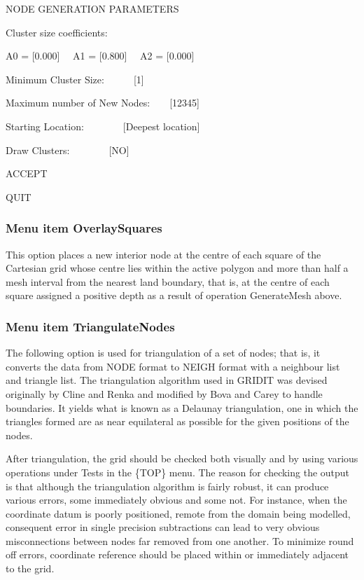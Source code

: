\documentclass{article}
\begin{document}
\begin{center}

NODE GENERATION PARAMETERS

Cluster size coefficients:

A0 = [0.000]\newline
\ \ A1 = [0.800]\newline
\ \ A2 = [0.000]

Minimum Cluster Size:\ \ \ \ \ \ [1]

Maximum number of New Nodes:\ \ \ \ [12345]

Starting Location:\ \ \ \ \ \ \ \ [Deepest location]

Draw Clusters:\ \ \ \ \ \ \ \ [NO]

ACCEPT

QUIT

\end{center}
\subsubsection[Menu item OverlaySquares]{Menu item OverlaySquares}
This option places a new interior node at the centre of each square of the Cartesian grid whose centre lies within the active polygon and more than half a mesh interval from the nearest land boundary, that is, at the centre of each square assigned a positive depth as a result of operation GenerateMesh above.

\subsubsection[Menu item TriangulateNodes]{Menu item TriangulateNodes}
The following option is used for triangulation of a set of nodes; that is, it converts the data from NODE format to NEIGH format with a neighbour list and triangle list. The triangulation algorithm used in GRIDIT was devised originally by Cline and Renka and modified by Bova and Carey to handle boundaries. It yields what is known as a Delaunay triangulation, one in which the triangles formed are as near equilateral as possible for the given positions of the nodes.

After triangulation, the grid should be checked both visually and by using various operations under Tests in the \{TOP\} menu. The reason for checking the output is that although the triangulation algorithm is fairly robust, it can produce various errors, some immediately obvious and some not. For instance, when the coordinate datum is poorly positioned, remote from the domain being modelled, consequent error in single precision subtractions can lead to very obvious misconnections between nodes far removed from one another. To minimize round off errors, coordinate reference should be placed within or immediately adjacent to the grid. 
\end{document}
